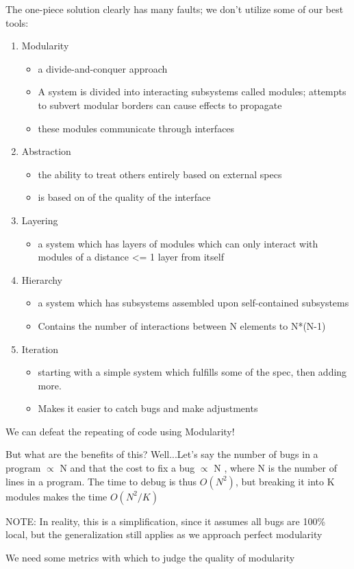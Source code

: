 \documentclass[../../lecture_notes.tex]{subfiles}
\begin{document}
The one-piece solution clearly has many faults; we don’t utilize some of our best tools:
\begin{enumerate}
\item Modularity \begin{itemize}
	\item a divide-and-conquer approach
	\item A system is divided into interacting subsystems called modules; attempts to subvert modular borders can cause effects to propagate 
	\item these modules communicate through interfaces  
	\end{itemize}
\item Abstraction \begin{itemize}
	\item the ability to treat others entirely based on external specs
	\item is based on of the quality of the interface
	\end{itemize}
\item Layering \begin{itemize}
	\item a system which has layers of modules which can only interact with modules of a distance <= 1 layer from itself
	\end{itemize}
\item Hierarchy \begin{itemize}
	\item a system which has subsystems assembled upon self-contained subsystems
	\item Contains the number of interactions between N elements to N*(N-1)           
	\end{itemize}
\item Iteration \begin{itemize}
	\item starting with a simple system which fulfills some of the spec, then adding more.        
	\item Makes it easier to catch bugs and make adjustments
	\end{itemize}
\end{enumerate}

We can defeat the repeating of code using Modularity!

But what are the benefits of this? Well...Let’s say the number of bugs in a program $\propto$ N and that the cost to fix a bug $\propto$ N , where N is the number of lines in a program. The time to debug is thus $O(N^2)$, but breaking it into K modules makes the time $O(N^2/K)$

NOTE: In reality, this is a simplification, since it assumes all bugs are 100\% local, but the generalization still applies as we approach perfect modularity

We need some metrics with which to judge the quality of modularity
\end{document}
